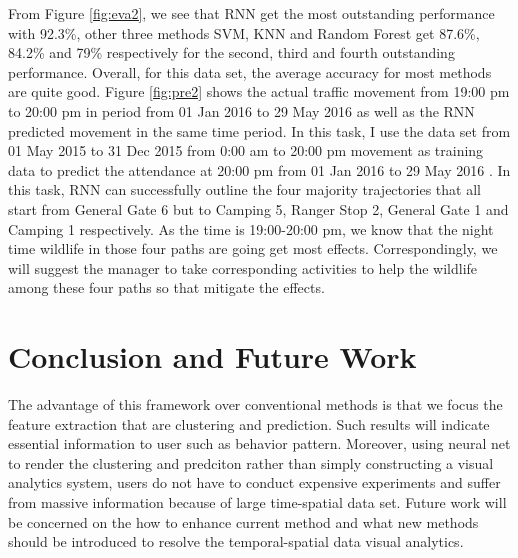 \documentclass[runningheads,a4paper]{llncs}
\begin{document}
From Figure \ref{fig:eva2}, we see that RNN get the most outstanding performance with 92.3\%, other three methods SVM, KNN and Random Forest get 87.6\%, 84.2\% and 79\% respectively for the second, third and fourth outstanding performance. Overall, for this data set, the average accuracy for most methods are quite good. Figure \ref{fig:pre2} shows the actual traffic movement from 19:00 pm to 20:00 pm in period from 01 Jan 2016 to 29 May 2016 as well as the RNN predicted movement in the same time period.  In this task, I use the data set from 01 May 2015 to 31 Dec 2015 from 0:00 am to 20:00 pm movement as training data to predict the attendance at 20:00 pm from 01 Jan 2016 to 29 May 2016 . In this task, RNN can successfully outline the four majority trajectories that all start from General Gate 6 but to Camping 5, Ranger Stop 2, General Gate 1 and Camping 1 respectively. As the time is 19:00-20:00 pm, we know that the night time wildlife in those four paths are going get most effects. Correspondingly, we will suggest the manager to take corresponding activities to help the wildlife among these four paths so that mitigate the effects.

\section{Conclusion and Future Work}
The advantage of this framework over conventional methods is that we focus the feature extraction that are clustering and prediction. Such results will indicate essential information to user such as behavior pattern. Moreover, using neural net to render the clustering and predciton rather than simply constructing a visual analytics system, users do not have to conduct expensive experiments and suffer from massive information because of large time-spatial data set. Future work will be concerned on the how to enhance current method and what new methods should be introduced to resolve the temporal-spatial data visual analytics.
\end{document}
